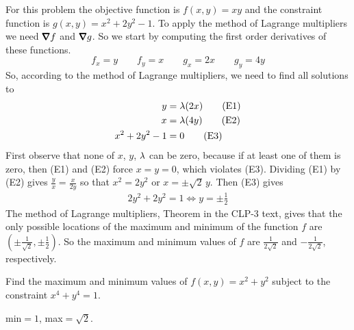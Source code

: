 \begin{solution}
For this problem the objective function is $f(x,y) = xy$
and the constraint function is $g(x,y)=x^2 + 2y^2 - 1$. 
To apply the method of Lagrange multipliers we need $\vnabla f$
and $\vnabla g$. So we start by computing the first order derivatives
of these functions.
\begin{equation*}
f_x=y\qquad
f_y=x\qquad
g_x=2x\qquad
g_y=4y
\end{equation*}
So, according to the method of Lagrange multipliers, we need to find all solutions to
\begin{align*}
y&=\lambda (2x) \tag{E1}\\
x&=\lambda (4y)  \tag{E2}\\
x^2+2y^2-1&=0 \tag{E3}
\end{align*}
First observe that none of $x$, $y$, $\lambda$ can be zero, because if at
least one of them is zero, then (E1) and (E2) force $x=y=0$, which violates
(E3). Dividing (E1) by (E2) gives $\frac{y}{x} = \frac{x}{2y}$
so that $x^2=2y^2$ or $x=\pm \sqrt{2}\,y$. Then (E3) gives
\begin{align*}
2y^2+2y^2=1
\iff y=\pm\frac{1}{2}
\end{align*}
The method of Lagrange multipliers, Theorem 
in the CLP-3 text, gives
that the only possible locations of the maximum and minimum of the function
$f$ are $\left(\pm\frac{1}{\sqrt{2}},\pm\frac{1}{2}\right)$. 
So the maximum and minimum values of $f$ are $\frac{1}{2\sqrt{2}}$
and $-\frac{1}{2\sqrt{2}}$, respectively.
\end{solution}

\begin{question}[M200 2008A] %
Find the maximum and minimum values of $f(x,y) = x^2 + y^2$ 
subject to the constraint $x^4 + y^4 = 1$.
\end{question}

%

\begin{answer}
min$=1$, max$=\sqrt{2}$.
\end{answer}

